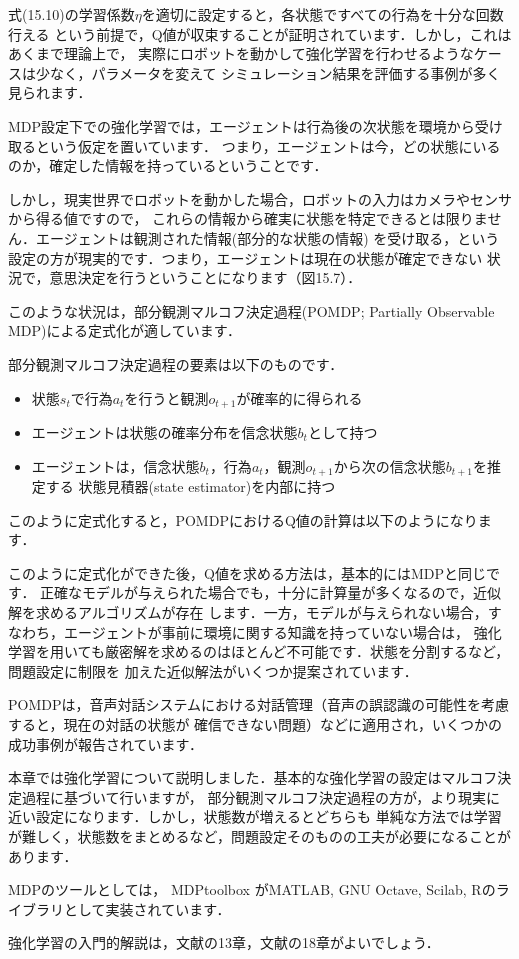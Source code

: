 式(15.10)の学習係数$\eta$を適切に設定すると，各状態ですべての行為を十分な回数行える
という前提で，Q値が収束することが証明されています．しかし，これはあくまで理論上で，
実際にロボットを動かして強化学習を行わせるようなケースは少なく，パラメータを変えて
シミュレーション結果を評価する事例が多く見られます．


MDP設定下での強化学習では，エージェントは行為後の次状態を環境から受け取るという仮定を置いています．
つまり，エージェントは今，どの状態にいるのか，確定した情報を持っているということです．

しかし，現実世界でロボットを動かした場合，ロボットの入力はカメラやセンサから得る値ですので，
これらの情報から確実に状態を特定できるとは限りません．エージェントは観測された情報(部分的な状態の情報)
を受け取る，という設定の方が現実的です．つまり，エージェントは現在の状態が確定できない
状況で，意思決定を行うということになります（図15.7）．

このような状況は，部分観測マルコフ決定過程(POMDP; Partially Observable MDP)による定式化が適しています．

部分観測マルコフ決定過程の要素は以下のものです．

\begin{itemize}
\item 状態$s_t$で行為$a_t$を行うと観測$o_{t+1}$が確率的に得られる
\item エージェントは状態の確率分布を信念状態$b_t$として持つ
\item エージェントは，信念状態$b_t$，行為$a_t$，観測$o_{t+1}$から次の信念状態$b_{t+1}$を推定する
状態見積器(state estimator)を内部に持つ
\end{itemize}


このように定式化すると，POMDPにおけるQ値の計算は以下のようになります．

このように定式化ができた後，Q値を求める方法は，基本的にはMDPと同じです．
正確なモデルが与えられた場合でも，十分に計算量が多くなるので，近似解を求めるアルゴリズムが存在
します．一方，モデルが与えられない場合，すなわち，エージェントが事前に環境に関する知識を持っていない場合は，
強化学習を用いても厳密解を求めるのはほとんど不可能です．状態を分割するなど，問題設定に制限を
加えた近似解法がいくつか提案されています．

POMDPは，音声対話システムにおける対話管理（音声の誤認識の可能性を考慮すると，現在の対話の状態が
確信できない問題）などに適用され，いくつかの成功事例が報告されています．


本章では強化学習について説明しました．基本的な強化学習の設定はマルコフ決定過程に基づいて行いますが，
部分観測マルコフ決定過程の方が，より現実に近い設定になります．しかし，状態数が増えるとどちらも
単純な方法では学習が難しく，状態数をまとめるなど，問題設定そのものの工夫が必要になることがあります．

MDPのツールとしては，
MDPtoolbox
がMATLAB, GNU Octave, Scilab, Rのライブラリとして実装されています．

強化学習の入門的解説は，文献\cite{mitchell97}の13章，文献\cite{alpaydin10}の18章がよいでしょう．
